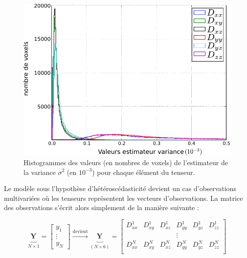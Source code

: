 \begin{figure}[ht]
    \centering
    \includegraphics[scale=0.6]{Images/hist_var.pdf}
    \caption{\label{hist_var}Histogrammes des valeurs (en nombres de voxels) de l'estimateur de la variance $\sigma^2$ (en $10^{-3}$)
    pour chaque élément du tenseur.}
\end{figure}

Le modèle sous l'hypothèse d'hétéroscédasticité devient un cas d'observations multivariées 
où les tenseurs représentent les vecteurs d'observations.
La matrice des observations s'écrit alors simplement de la manière suivante :

\begin{equation}
    \underbrace{\mathbf{Y}_{}}_{N\times 1} = \left[\begin{array}{c}
                                             y_1\\
                                             \vdots\\
                                             y_N
                                         \end{array}\right]
  \xrightarrow{\text{devient}}
  \underbrace{\mathbf{Y}_{}}_{(N\times 6)} = \left[\begin{array}{ccccccccccccc}
                                             D^1_{xx} & D^1_{xy} & D^1_{xz} & D^1_{yy} & D^1_{yz} & D^1_{zz}\\
                                              & & & \vdots & & \\
                                             D^N_{xx} & D^N_{xy} & D^N_{xz} & D^N_{yy} & D^N_{yz} & D^N_{zz}\\
                                         \end{array}\right]
\end{equation}

